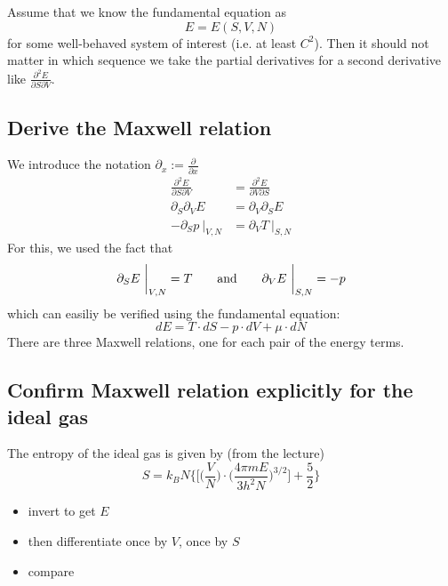 Assume that we know the fundamental equation as 
\begin{equation}
    E=E(S,V,N) 
\end{equation}
for some well-behaved system of interest (i.e. at least $C^2$). Then it should 
not matter in which sequence we take the partial derivatives for a second 
derivative like $\frac{\partial^2 E}{\partial S\partial V}$.

\subsection{Derive the Maxwell relation}
    We introduce the notation $\partial_x:=\frac{\partial}{\partial x}$
    \begin{align}
        \frac{\partial^2 E}{\partial S\partial V}
        &=\frac{\partial^2 E}{\partial V\partial S} \\
        \partial_S\partial_V E &=\partial_V\partial_S E \\
        -\partial_S p\ \bigg|_{V,N} &= \partial_V T\ \bigg|_{S,N} 
    \end{align}
    For this, we used the fact that
    \begin{equation}
        \partial_S E\ \bigg|_{V,N}=T
        \ \ \ \ \ \ \textnormal{and}\ \ \ \ \ \
        \partial_V E\ \bigg|_{S,N}=-p
    \end{equation}
    which can easiliy be verified using the fundamental equation:
    \begin{equation}
        dE=T\cdot dS-p\cdot dV+\mu\cdot dN
    \end{equation}
    There are three Maxwell relations, one for each pair of the energy terms.

\subsection{Confirm Maxwell relation explicitly for the ideal gas}
    The entropy of the ideal gas is given by (from the lecture)
    \begin{equation}
        S=k_BN\bigg\{\bigg[\bigg(\frac{V}{N}\bigg)\cdot
        \bigg(\frac{4\pi mE}{3h^2N}\bigg)^{3/2}\bigg]+\frac{5}{2}\bigg\}
    \end{equation}
    \begin{itemize}
        \item invert to get $E$
        \item then differentiate once by $V$, once by $S$
        \item compare
    \end{itemize}
